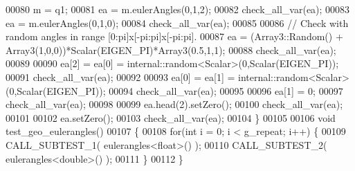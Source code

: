 \begin{DoxyCode}
00080   m = q1;
00081   ea = m.eulerAngles(0,1,2);
00082   check\_all\_var(ea);
00083   ea = m.eulerAngles(0,1,0);
00084   check\_all\_var(ea);
00085   
00086   \textcolor{comment}{// Check with random angles in range [0:pi]x[-pi:pi]x[-pi:pi].}
00087   ea = (Array3::Random() + Array3(1,0,0))*Scalar(EIGEN\_PI)*Array3(0.5,1,1);
00088   check\_all\_var(ea);
00089   
00090   ea[2] = ea[0] = internal::random<Scalar>(0,Scalar(EIGEN\_PI));
00091   check\_all\_var(ea);
00092   
00093   ea[0] = ea[1] = internal::random<Scalar>(0,Scalar(EIGEN\_PI));
00094   check\_all\_var(ea);
00095   
00096   ea[1] = 0;
00097   check\_all\_var(ea);
00098   
00099   ea.head(2).setZero();
00100   check\_all\_var(ea);
00101   
00102   ea.setZero();
00103   check\_all\_var(ea);
00104 \}
00105 
00106 \textcolor{keywordtype}{void} test\_geo\_eulerangles()
00107 \{
00108   \textcolor{keywordflow}{for}(\textcolor{keywordtype}{int} i = 0; i < g\_repeat; i++) \{
00109     CALL\_SUBTEST\_1( eulerangles<float>() );
00110     CALL\_SUBTEST\_2( eulerangles<double>() );
00111   \}
00112 \}
\end{DoxyCode}
